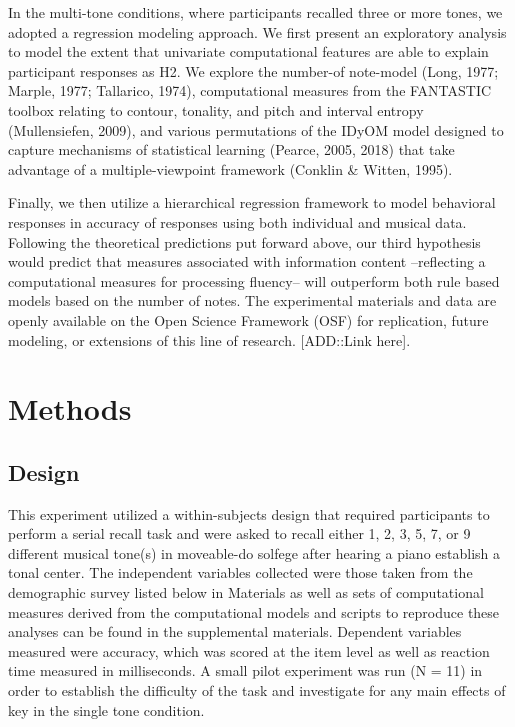 \documentclass[english,man]{apa6}
\begin{document}
In the multi-tone conditions, where participants recalled three or more tones, we adopted a regression modeling approach.
We first present an exploratory analysis to model the extent that univariate computational features are able to explain participant responses as H2. We explore the number-of note-model (Long, 1977; Marple, 1977; Tallarico, 1974), computational measures from the FANTASTIC toolbox relating to contour, tonality, and pitch and interval entropy (Mullensiefen, 2009), and various permutations of the IDyOM model designed to capture mechanisms of statistical learning (Pearce, 2005, 2018) that take advantage of a multiple-viewpoint framework (Conklin \& Witten, 1995).

Finally, we then utilize a hierarchical regression framework to model behavioral responses in accuracy of responses using both individual and musical data.\\
Following the theoretical predictions put forward above, our third hypothesis would predict that measures associated with information content --reflecting a computational measures for processing fluency-- will outperform both rule based models based on the number of notes.
The experimental materials and data are openly available on the Open Science Framework (OSF) for replication, future modeling, or extensions of this line of research. {[}ADD::Link here{]}.

\hypertarget{methods}{%
\section{Methods}\label{methods}}

\hypertarget{design}{%
\subsection{Design}\label{design}}

This experiment utilized a within-subjects design that required participants to perform a serial recall task and were asked to recall either 1, 2, 3, 5, 7, or 9 different musical tone(s) in moveable-do solfege after hearing a piano establish a tonal center.
The independent variables collected were those taken from the demographic survey listed below in Materials as well as sets of computational measures derived from the computational models and scripts to reproduce these analyses can be found in the supplemental materials.
Dependent variables measured were accuracy, which was scored at the item level as well as reaction time measured in milliseconds.
A small pilot experiment was run (N = 11) in order to establish the difficulty of the task and investigate for any main effects of key in the single tone condition.
\end{document}
